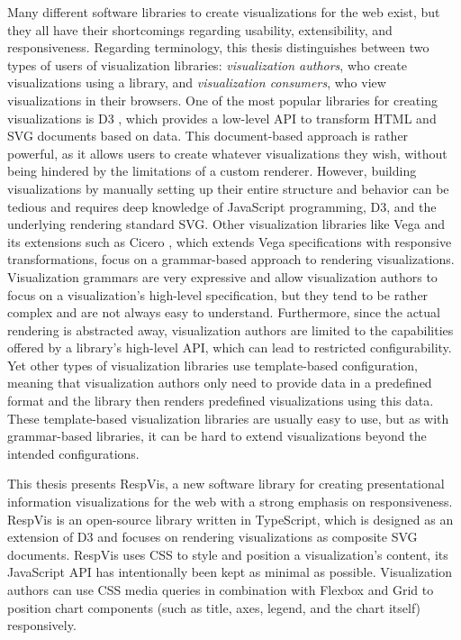 Many different software libraries to create visualizations for the web
exist, but they all have their shortcomings regarding usability,
extensibility, and responsiveness. Regarding terminology, this thesis
distinguishes between two types of users of visualization libraries:
\emph{visualization authors}, who create visualizations using a
library, and \emph{visualization consumers}, who view visualizations
in their browsers. One of the most popular libraries for creating
visualizations is D3 \parencite{D3,D3JS}, which provides a low-level
API to transform HTML and SVG documents based on data. This
document-based approach is rather powerful, as it allows users to
create whatever visualizations they wish, without being hindered by
the limitations of a custom renderer. However, building visualizations
by manually setting up their entire structure and behavior can be
tedious and requires deep knowledge of JavaScript programming, D3, and
the underlying rendering standard SVG.
%
Other visualization libraries like Vega \parencite{Vega} and its
extensions such as Cicero \parencite{Cicero}, which extends Vega
specifications with responsive transformations, focus on a
grammar-based approach to rendering visualizations. Visualization
grammars are very expressive and allow visualization authors to focus
on a visualization's high-level specification, but they tend to be
rather complex and are not always easy to understand. Furthermore,
since the actual rendering is abstracted away, visualization authors
are limited to the capabilities offered by a library's high-level API,
which can lead to restricted configurability.
%
Yet other types of visualization libraries use template-based
configuration, meaning that visualization authors only need to provide
data in a predefined format and the library then renders predefined
visualizations using this data. These template-based visualization
libraries are usually easy to use, but as with grammar-based
libraries, it can be hard to extend visualizations beyond the intended
configurations.


This thesis presents RespVis, a new software library for creating
presentational information visualizations for the web with a strong
emphasis on responsiveness. RespVis is an open-source library
\parencite{RespVisGitHub} written in TypeScript, which is designed as
an extension of D3 and focuses on rendering visualizations as
composite SVG documents. RespVis uses CSS to style and position a
visualization's content, its JavaScript API has intentionally been
kept as minimal as possible. Visualization authors can use CSS media
queries in combination with Flexbox and Grid to position chart
components (such as title, axes, legend, and the chart itself)
responsively.

